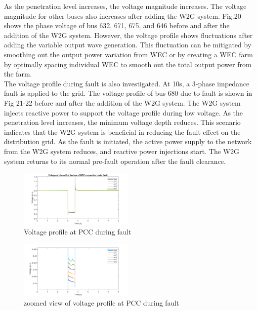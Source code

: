 \documentclass[conference]{IEEEtran}
\begin{document}
 As the penetration level increases, the voltage magnitude increases. The voltage magnitude for other buses also increases after adding the W2G system. Fig.20 shows the phase voltage of bus 632, 671, 675, and 646 before and after the addition of the W2G system. However, the voltage profile shows fluctuations after adding the variable output wave generation. This fluctuation can be mitigated by smoothing out the output power variation from WEC or by creating a WEC farm by optimally spacing individual WEC to smooth out the total output power from the farm.\\
 
The voltage profile during fault is also investigated. At 10s, a 3-phase impedance fault is applied to the grid. The voltage profile of bus 680 due to fault is shown in Fig 21-22 before and after the addition of the W2G system. The W2G system injects reactive power to support the voltage profile during low voltage. As the penetration level increases, the minimum voltage depth reduces. This scenario indicates that the W2G system is beneficial in reducing the fault effect on the distribution grid.  As the fault is initiated, the active power supply to the network from the W2G system reduces, and reactive power injections start. The W2G system returns to its normal pre-fault operation after the fault clearance. 
\begin{figure}[htbp]
    \centering
    \includegraphics[width=0.5\textwidth]{Figs/5_3_1/Vol dis fault.png}
    \caption{Voltage profile at PCC during fault}
    \label{fig:W2G_normal_grid}
\end{figure}
\begin{figure}[h!]
    \centering
    \includegraphics[width=0.5\textwidth]{Figs/5_3_1/Vol dis fault zoomed1.png}
    \caption{zoomed view of voltage profile at PCC during fault}
    \label{fig:W2G_normal_grid}
\end{figure}
\end{document}

